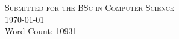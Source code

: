 \begin{titlepage}
\textsc{\large Submitted for the BSc in Computer Science}\\[0.5cm]



{\large \today}\\[0.5cm] %

{\large Word Count: 10931}\\[2cm]


\\[1cm]
 

\vfill %

\end{titlepage}
